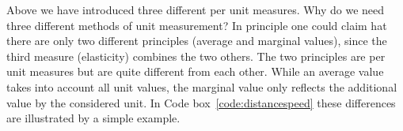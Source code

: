 \documentclass[11pt,fleqn]{book} %
\begin{document}
Above we have introduced three different per unit measures. Why do we need three different methods of unit measurement? In principle one could claim hat there are only two different principles (average and marginal values), since the third measure (elasticity) combines the two others. The two principles are per unit measures but are quite different from each other. While an average value takes into account all unit values, the marginal value only reflects the additional value by the considered unit. In Code box~\ref{code:distancespeed} these differences are illustrated by a simple example.

\end{document}

